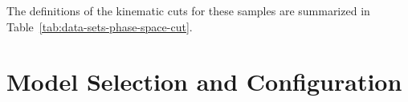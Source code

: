 The definitions of the kinematic cuts for these samples are summarized in Table~\ref{tab:data-sets-phase-space-cut}. 



\section{\genie Model Selection and Configuration}\label{sec:genie}




